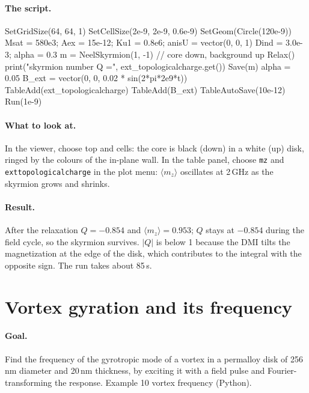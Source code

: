 \documentclass[11pt,a4paper,oneside]{book}
\newcommand{\code}[1]{\texttt{#1}}
\renewcommand{\_}{\textunderscore\allowbreak}
\newcommand{\menu}[1]{\textsf{#1}}
\begin{document}
\paragraph{The script.}
\begin{mxcode}
SetGridSize(64, 64, 1)
SetCellSize(2e-9, 2e-9, 0.6e-9)
SetGeom(Circle(120e-9))
Msat = 580e3;  Aex = 15e-12;  Ku1 = 0.8e6;  anisU = vector(0, 0, 1)
Dind = 3.0e-3; alpha = 0.3
m = NeelSkyrmion(1, -1)          // core down, background up
Relax()
print("skyrmion number Q =", ext_topologicalcharge.get())
Save(m)
alpha = 0.05
B_ext = vector(0, 0, 0.02 * sin(2*pi*2e9*t))
TableAdd(ext_topologicalcharge)
TableAdd(B_ext)
TableAutoSave(10e-12)
Run(1e-9)
\end{mxcode}

\paragraph{What to look at.} In the viewer, choose \menu{top} and \menu{cells}: the core is black (down) in a
white (up) disk, ringed by the colours of the in-plane wall. In the table panel, choose \code{mz} and
\code{ext\_topologicalcharge} in the \menu{plot} menu: $\langle m_z\rangle$ oscillates at 2\,GHz as the skyrmion grows and shrinks.

\paragraph{Result.} After the relaxation $Q = -0.854$ and $\langle m_z\rangle = 0.953$; $Q$ stays at
$-0.854$ during the field cycle, so the skyrmion survives. $|Q|$ is below 1 because the DMI tilts the
magnetization at the edge of the disk, which contributes to the integral with the opposite sign. The run takes
about 85\,s.

\section{Vortex gyration and its frequency}

\paragraph{Goal.} Find the frequency of the gyrotropic mode of a vortex in a permalloy disk of 256\,nm diameter
and 20\,nm thickness, by exciting it with a field pulse and Fourier-transforming the response. Example
\menu{10 vortex frequency} (Python).
\end{document}
